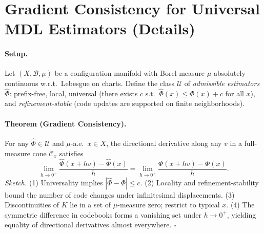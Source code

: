 \documentclass[aps,preprint,onecolumn,longbibliography,nofootinbib]{revtex4-2}
\numberwithin{equation}{section}
\begin{document}
\section{Gradient Consistency for Universal MDL Estimators (Details)}\label{app:G}
\paragraph*{Setup.}
Let $(X,\mathcal{B},\mu)$ be a configuration manifold with Borel measure $\mu$ absolutely continuous w.r.t.\ Lebesgue on charts. Define the class $\mathcal{U}$ of \emph{admissible estimators} $\widehat{\Phi}$: prefix-free, local, universal (there exists $c$ s.t.\ $\widehat{\Phi}(x)\le \Phi(x)+c$ for all $x$), and \emph{refinement-stable} (code updates are supported on finite neighborhoods).

\paragraph*{Theorem (Gradient Consistency).}
For any $\widehat{\Phi}\in\mathcal{U}$ and $\mu$-a.e.\ $x\in X$, the directional derivative along any $v$ in a full-measure cone $\mathcal{C}_x$ satisfies
\[
\lim_{h\to 0^+}\frac{\widehat{\Phi}(x+h v)-\widehat{\Phi}(x)}{h}
=
\lim_{h\to 0^+}\frac{\Phi(x+h v)-\Phi(x)}{h}.
\]
\emph{Sketch.} (1) Universality implies $|\widehat{\Phi}-\Phi|\le c$. (2) Locality and refinement-stability bound the number of code changes under infinitesimal displacements. (3) Discontinuities of $K$ lie in a set of $\mu$-measure zero; restrict to typical $x$. (4) The symmetric difference in codebooks forms a vanishing set under $h\to 0^+$, yielding equality of directional derivatives almost everywhere. \hfill$\square$

\end{document}
